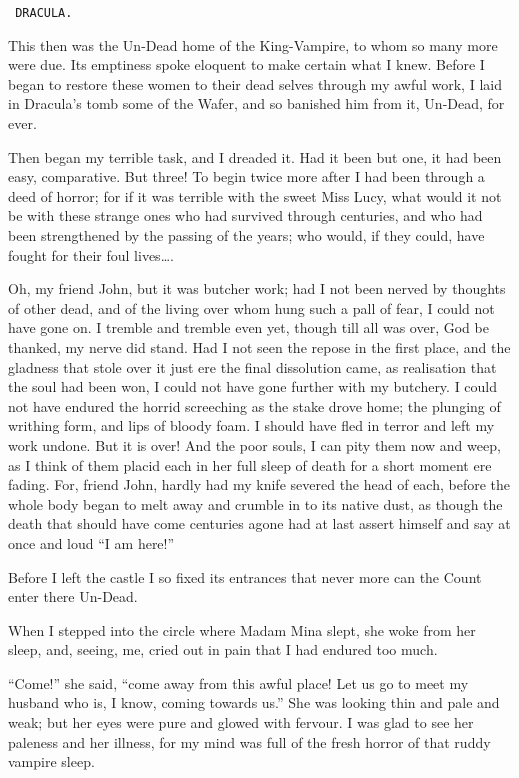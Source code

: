 \documentclass[12pt,openright]{book}
\begin{document}
\texttt{                            DRACULA.}

This then was the Un-Dead home of the King-Vampire, to whom so many more were due. Its emptiness spoke eloquent to make certain what I knew. Before I began to restore these women to their dead selves through my awful work, I laid in Dracula’s tomb some of the Wafer, and so banished him from it, Un-Dead, for ever.

Then began my terrible task, and I dreaded it. Had it been but one, it had been easy, comparative. But three! To begin twice more after I had been through a deed of horror; for if it was terrible with the sweet Miss Lucy, what would it not be with these strange ones who had survived through centuries, and who had been strengthened by the passing of the years; who would, if they could, have fought for their foul lives….

Oh, my friend John, but it was butcher work; had I not been nerved by thoughts of other dead, and of the living over whom hung such a pall of fear, I could not have gone on. I tremble and tremble even yet, though till all was over, God be thanked, my nerve did stand. Had I not seen the repose in the first place, and the gladness that stole over it just ere the final dissolution came, as realisation that the soul had been won, I could not have gone further with my butchery. I could not have endured the horrid screeching as the stake drove home; the plunging of writhing form, and lips of bloody foam. I should have fled in terror and left my work undone. But it is over! And the poor souls, I can pity them now and weep, as I think of them placid each in her full sleep of death for a short moment ere fading. For, friend John, hardly had my knife severed the head of each, before the whole body began to melt away and crumble in to its native dust, as though the death that should have come centuries agone had at last assert himself and say at once and loud “I am here!”

Before I left the castle I so fixed its entrances that never more can the Count enter there Un-Dead.

When I stepped into the circle where Madam Mina slept, she woke from her sleep, and, seeing, me, cried out in pain that I had endured too much.

“Come!” she said, “come away from this awful place! Let us go to meet my husband who is, I know, coming towards us.” She was looking thin and pale and weak; but her eyes were pure and glowed with fervour. I was glad to see her paleness and her illness, for my mind was full of the fresh horror of that ruddy vampire sleep.
\end{document}
